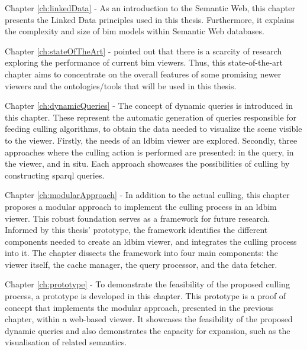 \begin{refsection}
\begin{multicols}{2}
        \textsf{Chapter \ref{ch:linkedData} -}
        As an introduction to the Semantic Web, this chapter presents the Linked Data principles used in this thesis. Furthermore, it explains the complexity and size of \ac{bim} models within Semantic Web databases.

        \textsf{Chapter \ref{ch:stateOfTheArt} -}
        \cite{Johansson2015} pointed out that there is a scarcity of research exploring the performance of current \ac{bim} viewers. Thus, this state-of-the-art chapter aims to concentrate on the overall features of some promising newer viewers and the ontologies/tools that will be used in this thesis.

        \textsf{Chapter \ref{ch:dynamicQueries} -}
        The concept of dynamic queries is introduced in this chapter. These represent the automatic generation of queries responsible for feeding culling algorithms, to obtain the data needed to visualize the scene visible to the viewer. Firstly, the needs of an \ac{ldbim} viewer are explored. Secondly, three approaches where the culling action is performed are presented: in the query, in the viewer, and in situ. Each approach showcases the possibilities of culling by constructing \ac{sparql} queries.

        \textsf{Chapter \ref{ch:modularApproach} -}
        In addition to the actual culling, this chapter proposes a modular approach to implement the culling process in an \ac{ldbim} viewer. This robust foundation serves as a framework for future research. Informed by this thesis' prototype, the framework identifies the different components needed to create an \ac{ldbim} viewer, and integrates the culling process into it. The chapter dissects the framework into four main components: the viewer itself, the cache manager, the query processor, and the data fetcher.

        \textsf{Chapter \ref{ch:prototype} -}
        To demonstrate the feasibility of the proposed culling process, a prototype is developed in this chapter. This prototype is a proof of concept that implements the modular approach, presented in the previous chapter, within a web-based viewer. It showcases the feasibility of the proposed dynamic queries and also demonstrates the capacity for expansion, such as the visualisation of related semantics.


\end{multicols}
\end{refsection}
